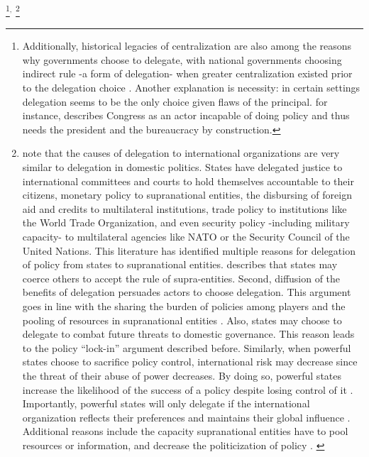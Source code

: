 \documentclass[12pt]{amsart}
\numberwithin{equation}{section}
\theoremstyle{definition}
\theoremstyle{definition}
\theoremstyle{definition}
\begin{document}
\footnote{Additionally, historical legacies of centralization are also among the reasons why governments choose to delegate, with national governments choosing indirect rule -a form of delegation- when greater centralization existed prior to the delegation choice \citep{gerring_etal_2011}. Another explanation is necessity: in certain settings delegation seems to be the only choice given flaws of the principal. \citet{huntington_1995} for instance, describes Congress as an actor incapable of doing policy and thus needs the president and the bureaucracy by construction.}$^,$ \footnote{\citet{Hawkins_etal_2006} note that the causes of delegation to international organizations are very similar to delegation in domestic politics. States have delegated justice to international committees and courts to hold themselves accountable to their citizens, monetary policy to supranational entities, the disbursing of foreign aid and credits to multilateral institutions, trade policy to institutions like the World Trade Organization, and even security policy -including military capacity- to multilateral agencies like NATO or the Security Council of the United Nations. This literature has identified multiple reasons for delegation of policy from states to supranational entities. \citet{Moravcsik_2000} describes that states may coerce others to accept the rule of supra-entities. Second, diffusion of the benefits of delegation persuades actors to choose delegation. This argument goes in line with the sharing the burden of policies among players and the pooling of resources in supranational entities \citep{milner_2011}. Also, states may choose to delegate to combat future threats to domestic governance. This reason leads to the policy ``lock-in'' argument described before. Similarly, when powerful states choose to sacrifice policy control, international risk may decrease since the threat of their abuse of power decreases. By doing so, powerful states increase the likelihood of the success of a policy despite losing control of it \citep{lake_2009, milner_2011}. Importantly, powerful states will only delegate if the international organization reflects their preferences and maintains their global influence \citep{Hawkins_etal_2006}. Additional reasons include the capacity supranational entities have to pool resources or information, and decrease the politicization of policy \citet{Rodrick_1996}. \label{footnote:international_delegation}} 
\end{document}
